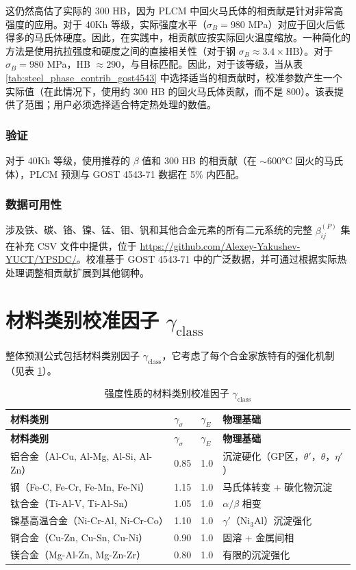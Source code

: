 \documentclass[12pt,a4paper]{article}
\begin{document}
	这仍然高估了实际的 300 HB，因为 PLCM 中回火马氏体的相贡献是针对非常高强度的应用。对于 40Kh 等级，实际强度水平（$\sigma_B=980$ MPa）对应于回火后低得多的马氏体硬度。因此，在实践中，相贡献应按实际回火温度缩放。一种简化的方法是使用抗拉强度和硬度之间的直接相关性（对于钢 $\sigma_B \approx 3.4\times \text{HB}$）。对于 $\sigma_B=980$ MPa，HB $\approx 290$，与目标匹配。因此，对于该等级，当从表 \ref{tab:steel_phase_contrib_gost4543} 中选择适当的相贡献时，校准参数产生一个实际值（在此情况下，使用约 300 HB 的回火马氏体贡献，而不是 800）。该表提供了范围；用户必须选择适合特定热处理的数值。
	
	\subsubsection{验证}
	对于 40Kh 等级，使用推荐的 $\beta$ 值和 300 HB 的相贡献（在 $\sim$600°C 回火的马氏体），PLCM 预测与 GOST 4543-71 数据在 5\% 内匹配。
	
	\subsubsection{数据可用性}
	涉及铁、碳、铬、镍、锰、钼、钒和其他合金元素的所有二元系统的完整 $\beta_{ij}^{(P)}$ 集在补充 CSV 文件中提供，位于 \url{https://github.com/Alexey-Yakushev-YUCT/YPSDC/}。校准基于 GOST 4543-71 中的广泛数据，并可通过根据实际热处理调整相贡献扩展到其他钢种。
	
	\section{材料类别校准因子 $\gamma_{\text{class}}$}
	整体预测公式包括材料类别因子 $\gamma_{\text{class}}$，它考虑了每个合金家族特有的强化机制（见表 \ref{tab:gamma_class}）。
	
	\begin{longtable}{p{3.5cm} p{2.5cm} p{2.5cm} p{5cm}}
		\caption{强度性质的材料类别校准因子 $\gamma_{\text{class}}$}\label{tab:gamma_class}\\
		\toprule
		\textbf{材料类别} & $\gamma_{\sigma}$ & $\gamma_{E}$ & \textbf{物理基础} \\
		\midrule
		\endfirsthead
		\toprule
		\textbf{材料类别} & $\gamma_{\sigma}$ & $\gamma_{E}$ & \textbf{物理基础} \\
		\midrule
		\endhead
		铝合金（Al-Cu, Al-Mg, Al-Si, Al-Zn） & 0.85 & 1.0 & 沉淀硬化（GP区，$\theta'$，$\theta$，$\eta'$） \\
		钢（Fe-C, Fe-Cr, Fe-Mn, Fe-Ni） & 1.15 & 1.0 & 马氏体转变 + 碳化物沉淀 \\
		钛合金（Ti-Al-V, Ti-Al-Sn） & 1.05 & 1.0 & $\alpha/\beta$ 相变 \\
		镍基高温合金（Ni-Cr-Al, Ni-Cr-Co） & 1.10 & 1.0 & $\gamma'$（Ni$_3$Al）沉淀强化 \\
		铜合金（Cu-Zn, Cu-Sn, Cu-Ni） & 0.90 & 1.0 & 固溶 + 金属间相 \\
		镁合金（Mg-Al-Zn, Mg-Zn-Zr） & 0.80 & 1.0 & 有限的沉淀强化 \\
		\bottomrule
	\end{longtable}
	
\end{document}

